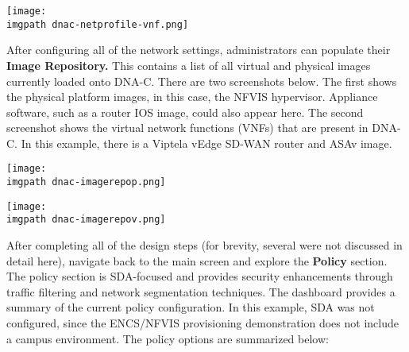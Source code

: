     \begin{minipage}[t]{\linewidth}
	  \centering
      \texttt{[image: \\imgpath dnac-netprofile-vnf.png]}
    \end{minipage}

After configuring all of the network settings, administrators can populate
their \textbf{Image Repository.} This contains a list of all virtual and physical
images currently loaded onto DNA-C. There are two screenshots below. The first
shows the physical platform images, in this case, the NFVIS hypervisor.
Appliance software, such as a router IOS image, could also appear here. The
second screenshot shows the virtual network functions (VNFs) that are present
in DNA-C. In this example, there is a Viptela vEdge SD-WAN router and ASAv image.

    \begin{minipage}[t]{\linewidth}
	  \centering
      \texttt{[image: \\imgpath dnac-imagerepop.png]}
    \end{minipage}

    \begin{minipage}[t]{\linewidth}
	  \centering
      \texttt{[image: \\imgpath dnac-imagerepov.png]}
    \end{minipage}

After completing all of the design steps (for brevity, several were not
discussed in detail here), navigate back to the main screen and explore the
\textbf{Policy} section. The policy section is SDA-focused and provides
security enhancements through traffic filtering and network segmentation
techniques. The dashboard provides a summary of the current policy
configuration. In this example, SDA was not configured, since the ENCS/NFVIS
provisioning demonstration does not include a campus environment. The policy
options are summarized below:

